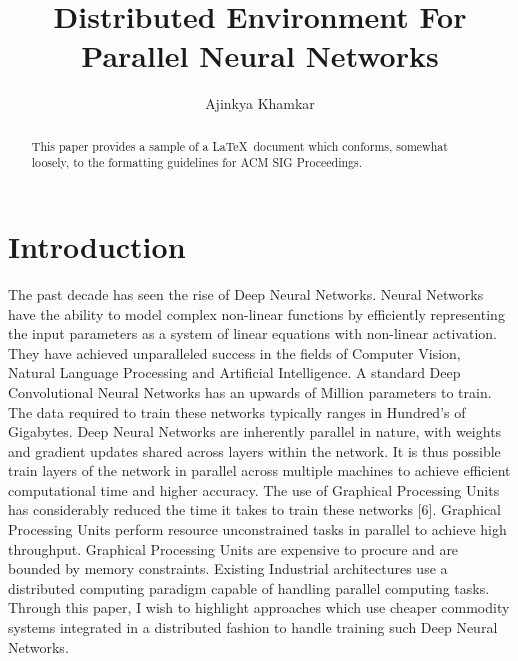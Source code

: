 \documentclass[sigconf]{acmart}
\begin{document}
\title{Distributed Environment For Parallel Neural Networks}


\author{Ajinkya Khamkar}

\renewcommand{\shortauthors}{B. Trovato et al.}


\begin{abstract}
This paper provides a sample of a \LaTeX\ document which conforms,
somewhat loosely, to the formatting guidelines for
ACM SIG Proceedings.
\end{abstract}



\maketitle

\section{Introduction}

The past decade has seen the rise of Deep Neural Networks. Neural Networks have the ability to model complex non-linear functions by efficiently representing the input parameters as a system of linear equations with non-linear activation. They have achieved unparalleled success in the fields of Computer Vision, Natural Language Processing and Artificial Intelligence. A standard Deep Convolutional Neural Networks has an upwards of Million parameters to train\cite{NIPS2012_4824}. The data required to train these networks typically ranges in Hundred's of Gigabytes. Deep Neural Networks are inherently parallel in nature, with weights and gradient updates shared across layers within the network. It is thus possible train layers of the network in parallel across multiple machines to achieve efficient computational time and higher accuracy. The use of Graphical Processing Units has considerably reduced the time it takes to train these networks [6]. Graphical Processing Units perform resource unconstrained tasks in parallel to achieve high throughput. Graphical Processing Units are expensive to procure and are bounded by memory constraints. Existing Industrial architectures use a distributed computing paradigm capable of handling parallel computing tasks. Through this paper, I wish to highlight approaches which use cheaper commodity systems integrated in a distributed fashion to handle training such Deep Neural Networks.
\end{document}

